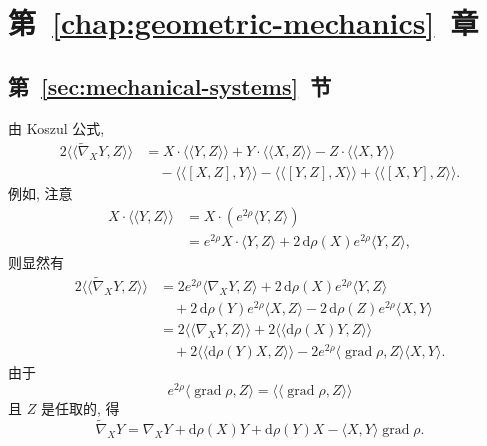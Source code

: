 \section{\texorpdfstring{第~\ref{chap:geometric-mechanics}~章}{几何力学}}\label{sec:solutions-geometric-mechanics}
\subsection{\texorpdfstring{第~\ref{sec:mechanical-systems}~节}{力学系统}}\label{subsec:solutions-mechanical-systems}

\begin{description}[font=\normalfont,leftmargin=2em,labelwidth=1.5em]
由 Koszul 公式,
\begin{align*}
  2\langle\langle\widetilde\nabla_XY,Z\rangle\rangle
  &=X\cdot\langle\langle Y,Z\rangle\rangle+Y\cdot\langle\langle X,Z\rangle\rangle
     -Z\cdot\langle\langle X,Y\rangle\rangle\\
  &\quad-\langle\langle[X,Z],Y\rangle\rangle-\langle\langle[Y,Z],X\rangle\rangle
     +\langle\langle[X,Y],Z\rangle\rangle.
\end{align*}
例如, 注意
\begin{align*}
  X\cdot\langle\langle Y,Z\rangle\rangle
  &=X\cdot\left(e^{2\rho}\langle Y,Z\rangle\right)\\
  &=e^{2\rho}X\cdot\langle Y,Z\rangle+2\,\mathrm{d}\rho(X)e^{2\rho}\langle Y,Z\rangle,
\end{align*}
则显然有
\begin{align*}
  2\langle\langle\widetilde\nabla_XY,Z\rangle\rangle
  &=2e^{2\rho}\langle\nabla_XY,Z\rangle+2\,\mathrm{d}\rho(X)e^{2\rho}\langle Y,Z\rangle\\
  &\quad+2\,\mathrm{d}\rho(Y)e^{2\rho}\langle X,Z\rangle-2\,\mathrm{d}\rho(Z)e^{2\rho}\langle X,Y\rangle\\
  &=2\langle\langle\nabla_XY,Z\rangle\rangle+2\langle\langle\mathrm{d}\rho(X)Y,Z\rangle\rangle\\
  &\quad+2\langle\langle\mathrm{d}\rho(Y)X,Z\rangle\rangle
       -2e^{2\rho}\langle\operatorname{grad}\rho,Z\rangle\langle X,Y\rangle.
\end{align*}
由于
\[
  e^{2\rho}\langle\operatorname{grad}\rho,Z\rangle
    =\langle\langle\operatorname{grad}\rho,Z\rangle\rangle
\]
且 $Z$ 是任取的, 得
\[
  \widetilde\nabla_XY=\nabla_XY+\mathrm{d}\rho(X)Y+\mathrm{d}\rho(Y)X
     -\langle X,Y\rangle\operatorname{grad}\rho.
\]


\end{description}
